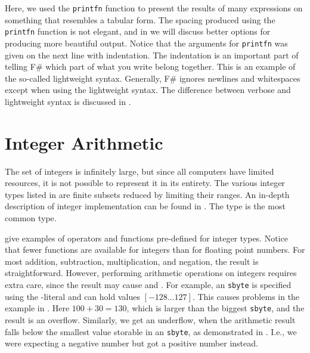 \documentclass[fsharpNotes.tex]{subfiles}
\begin{document}
Here, we used the \lstinline|printfn| function to present the results of many expressions on something that resembles a tabular form. The spacing produced using the \lstinline|printfn| function is not elegant, and in   we will discuss better options for producing more beautiful output. Notice that the arguments for \lstinline|printfn| was given on the next line with indentation. The indentation is an important part of telling F\# which part of what you write belong together. This is an example of the so-called lightweight syntax. Generally, F\# ignores newlines and whitespaces except when using the lightweight syntax. The difference between verbose and lightweight syntax is discussed in .

\section{Integer Arithmetic}
The set of integers is infinitely large, but since all computers have limited resources, it is not possible to represent it in its entirety. The various integer types listed in  are finite subsets reduced by limiting their ranges. 
An in-depth description of integer implementation can be found in . The type  is the most common type. 

 give examples of operators and functions pre-defined for integer types. Notice that fewer functions are available for integers than for floating point numbers. For most addition, subtraction, multiplication, and negation, the result is straightforward. However, performing arithmetic operations on integers requires extra care, since the result may cause  and . For example, an \lstinline|sbyte| is specified using the -literal and can hold values $[-128\ldots 127]$. This causes problems in the example in .
%
%
Here $100+30=130$, which is larger than the biggest \lstinline|sbyte|, and the result is an overflow. Similarly, we get an underflow, when the arithmetic result falls below the smallest value storable in an \lstinline|sbyte|, as demonstrated in .
%
%
I.e., we were expecting a negative number but got a positive number instead.
\end{document}
